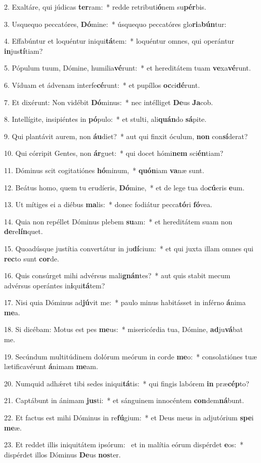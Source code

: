 2. Exaltáre, qui júdicas \textbf{ter}ram:~*  redde retributi\textbf{ó}nem su\textbf{pér}bis.\

3. Usquequo peccatóres, \textbf{Dó}mine:~*  úsquequo peccatóres glo\textbf{ri}a\textbf{bún}tur:\

4. Effabúntur et loquéntur iniqui\textbf{tá}tem:~*  loquéntur omnes, qui operántur \textbf{in}jus\textbf{tí}tiam?\

5. Pópulum tuum, Dómine, humilia\textbf{vé}runt:~*  et hereditátem tuam \textbf{ve}xa\textbf{vé}runt.\

6. Víduam et ádvenam interfe\textbf{cé}runt:~*  et pupíllos \textbf{oc}ci\textbf{dé}runt.\

7. Et dixérunt: Non vidébit \textbf{Dó}minus:~*  nec intélliget \textbf{De}us \textbf{Ja}cob.\

8. Intellígite, insipiéntes in \textbf{pó}pulo:~*  et stulti, ali\textbf{quán}do \textbf{sá}pite.\

9. Qui plantávit aurem, non \textbf{áu}diet?~*  aut qui finxit óculum, \textbf{non} con\textbf{sí}derat?\

10. Qui córripit Gentes, non \textbf{ár}guet:~*  qui docet hómi\textbf{nem} sci\textbf{én}tiam?\

11. Dóminus scit cogitatiónes \textbf{hó}minum,~*  \textbf{quón}iam \textbf{va}næ sunt.\

12. Beátus homo, quem tu erudíeris, \textbf{Dó}mine,~*  et de lege tua do\textbf{cú}eris \textbf{e}um.\

13. Ut mítiges ei a diébus \textbf{ma}lis:~*  donec fodiátur pecca\textbf{tó}ri \textbf{fó}vea.\

14. Quia non repéllet Dóminus plebem \textbf{su}am:~*  et hereditátem suam non \textbf{de}re\textbf{lín}quet.\

15. Quoadúsque justítia convertátur in ju\textbf{dí}cium:~*  et qui juxta illam omnes qui \textbf{rec}to sunt \textbf{cor}de.\

16. Quis consúrget mihi advérsus mali\textbf{gnán}tes?~*  aut quis stabit mecum advérsus operántes in\textbf{i}qui\textbf{tá}tem?\

17. Nisi quia Dóminus ad\textbf{jú}vit me:~*  paulo minus habitásset in inférno \textbf{á}nima \textbf{me}a.\

18. Si dicébam: Motus est pes \textbf{me}us:~*  misericórdia tua, Dómine, \textbf{ad}ju\textbf{vá}bat me.\

19. Secúndum multitúdinem dolórum meórum in corde \textbf{me}o:~*  consolatiónes tuæ lætificavérunt \textbf{á}nimam \textbf{me}am.\

20. Numquid adhǽret tibi sedes iniqui\textbf{tá}tis:~*  qui fingis labórem \textbf{in} præ\textbf{cép}to?\

21. Captábunt in ánimam \textbf{jus}ti:~*  et sánguinem innocéntem \textbf{con}dem\textbf{ná}bunt.\

22. Et factus est mihi Dóminus in re\textbf{fú}gium:~*  et Deus meus in adjutórium \textbf{spe}i \textbf{me}æ.\

23. Et reddet illis iniquitátem ipsórum: \dag\  et in malítia eórum dispérdet \textbf{e}os:~*  dispérdet illos Dóminus \textbf{De}us \textbf{nos}ter.\

